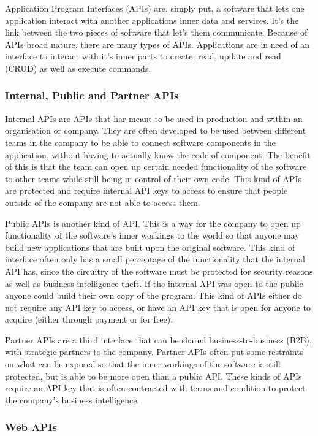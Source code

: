\documentclass{article}
\begin{document}
Application Program Interfaces (APIs) are, simply put, a software that
lets one application interact with another applications inner data and
services. It's the link between the two pieces of software that let's
them communicate. Because of APIs broad nature, there are many types of
APIs. Applications are in need of an interface to interact with it's
inner parts to create, read, update and read (CRUD) as well as execute
commands.

\subsubsection{Internal, Public and Partner APIs}

Internal APIs are APIs that har meant to be used in production and
within an organisation or company. They are often developed to be used
between different teams in the company to be able to connect software
components in the application, without having to actually know the code
of component. The benefit of this is that the team can open up certain
needed functionality of the software to other teams while still being in
control of their own code. This kind of APIs are protected and require
internal API keys to access to ensure that people outside of the company
are not able to access them.

Public APIs is another kind of API. This is a way for the company to
open up functionality of the software's inner workings to the world so
that anyone may build new applications that are built upon the original
software. This kind of interface often only has a small percentage of
the functionality that the internal API has, since the circuitry of the
software must be protected for security reasons as well as business
intelligence theft. If the internal API was open to the public anyone
could build their own copy of the program. This kind of APIs either do
not require any API key to access, or have an API key that is open for
anyone to acquire (either through payment or for free).

Partner APIs are a third interface that can be shared
business-to-business (B2B), with strategic partners to the company.
Partner APIs often put some restraints on what can be exposed so that
the inner workings of the software is still protected, but is able to be
more open than a public API. These kinds of APIs require an API key that
is often contracted with terms and condition to protect the company's
business intelligence.\cite{levin}

\subsubsection{Web APIs}
\end{document}
